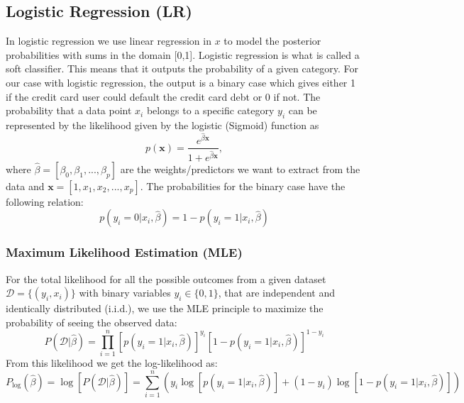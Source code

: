 \documentclass[12pt,a4paper,english]{article}
\begin{document}
\subsection{Logistic Regression (LR)}
\label{subsect:LR}
In logistic regression we use linear regression in $x$ to model the posterior probabilities with sums in the domain [0,1]. Logistic regression is what is called a soft classifier. This means that it outputs the probability of a given category. For our case with logistic regression, the output is a binary case which gives either 1 if the credit card user could default the credit card debt or 0 if not. The probability that a data point $x_i$ belongs to a specific category $y_i$ can be represented by the likelihood given by the logistic (Sigmoid) function as
\begin{equation}
\label{eq:sigmoid}
p(\textbf{x})=\frac{e^{\hat{\beta}\textbf{x}}}{1+e^{\hat{\beta}\textbf{x}}},
\end{equation}
where $\hat{\beta}=[\beta_0,\beta_1,...,\beta_p]$ are the weights/predictors we want to extract from the data and $\textbf{x}=[1,x_1,x_2,...,x_p]$. The probabilities for the binary case have the following relation:
\begin{equation*}
p(y_i=0|x_i,\hat{\beta})=1-p(y_i=1|x_i,\hat{\beta})
\end{equation*}

\subsubsection{Maximum Likelihood Estimation (MLE)}
\label{subsect:MLE}
For the total likelihood for all the possible outcomes from a given dataset $\mathcal{D}=\{(y_i, x_i)\}$ with binary variables $y_i\in\{0,1\}$, that are independent and identically distributed (i.i.d.), we use the MLE principle to maximize the probability of seeing the observed data:
\begin{equation}
\label{eq:max_likelihood}
P(\mathcal{D}|\hat{\beta})=\prod_{i=1}^{n}\left[p(y_i=1|x_i,\hat{\beta})\right]^{y_i}\left[1-p(y_i=1|x_i,\hat{\beta})\right]^{1-y_i}
\end{equation}
From this likelihood we get the log-likelihood as:
\begin{equation}
\label{eq:log_likelihood}
P_{\log }(\hat{\beta})=\log[P(\mathcal{D}|\hat{\beta})]=\sum_{i=1}^{n}\left(y_i\log[p(y_i=1|x_i,\hat{\beta})]+(1-y_i)\log[1-p(y_i=1|x_i,\hat{\beta})]\right)
\end{equation}
\end{document}
